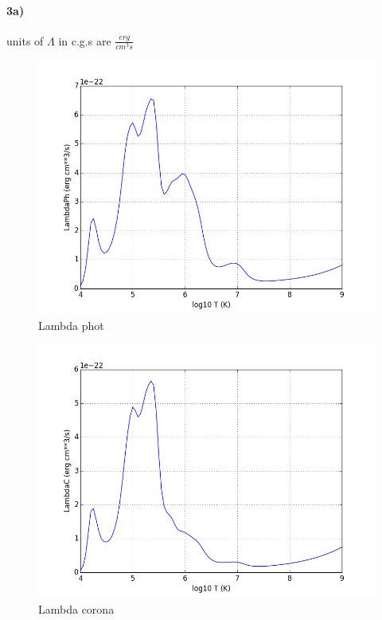 \documentclass[10pt]{book}
\begin{document}
\paragraph{3a)}

units of $\Lambda$ in c.g.s are $\frac{erg}{cm^3 s}$ 

\begin{figure}[H]
 \centering
 \includegraphics[scale=0.5]{lambdaPh.png}
 \caption{ Lambda phot}
\end{figure}

\begin{figure}[H]
 \centering
 \includegraphics[scale=0.5]{lambdaC.png}
 \caption{ Lambda corona}
\end{figure}
\end{document}
